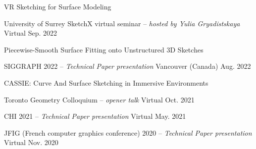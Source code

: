 \begin{cventries}
\cvtalkseries
    {VR Sketching for Surface Modeling}
    {\begin{cvtalks}
        \item {\cvtalk
            {University of Surrey SketchX virtual seminar -- \textit{hosted by Yulia Gryadistskaya}}
            {Virtual} %
            {Sep. 2022} %
            }
    \end{cvtalks}}
    
\cvtalkseries
    {Piecewise-Smooth Surface Fitting onto Unstructured 3D Sketches}
    {\begin{cvtalks}
        \item {\cvtalk
            {SIGGRAPH 2022 -- \textit{Technical Paper presentation}}
            {Vancouver (Canada)} %
            {Aug. 2022} %
            }
    \end{cvtalks}}

\cvtalkseries
    {CASSIE: Curve And Surface Sketching in Immersive Environments}
    {\begin{cvtalks}
        \item {\cvtalk
            {Toronto Geometry Colloquium -- \textit{opener talk}}
            {Virtual} %
            {Oct. 2021} %
            }
        \item {\cvtalk
            {CHI 2021 -- \textit{Technical Paper presentation}}
            {Virtual} %
            {May. 2021} %
            }
        \item {\cvtalk
            {JFIG (French computer graphics conference) 2020 -- \textit{Technical Paper presentation}}
            {Virtual} %
            {Nov. 2020} %
            }
    \end{cvtalks}}

\end{cventries}
